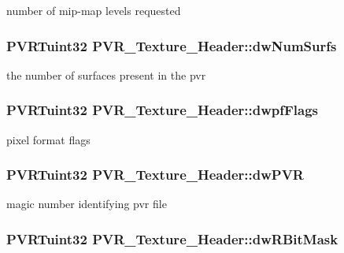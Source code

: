 number of mip-\/map levels requested \hypertarget{struct_p_v_r___texture___header_a9935bb426fcdb2b1ec3fab9fab003a98}{
\subsubsection[{dw\+Num\+Surfs}]{\setlength{\rightskip}{0pt plus 5cm}P\+V\+R\+Tuint32 P\+V\+R\+\_\+\+Texture\+\_\+\+Header\+::dw\+Num\+Surfs}}\label{struct_p_v_r___texture___header_a9935bb426fcdb2b1ec3fab9fab003a98}
the number of surfaces present in the pvr \hypertarget{struct_p_v_r___texture___header_a5e5b584c49798aeffea0ee25a1c55019}{
\subsubsection[{dwpf\+Flags}]{\setlength{\rightskip}{0pt plus 5cm}P\+V\+R\+Tuint32 P\+V\+R\+\_\+\+Texture\+\_\+\+Header\+::dwpf\+Flags}}\label{struct_p_v_r___texture___header_a5e5b584c49798aeffea0ee25a1c55019}
pixel format flags \hypertarget{struct_p_v_r___texture___header_a97a44950be630b5f67ad62cd94648f5f}{
\subsubsection[{dw\+P\+V\+R}]{\setlength{\rightskip}{0pt plus 5cm}P\+V\+R\+Tuint32 P\+V\+R\+\_\+\+Texture\+\_\+\+Header\+::dw\+P\+V\+R}}\label{struct_p_v_r___texture___header_a97a44950be630b5f67ad62cd94648f5f}
magic number identifying pvr file \hypertarget{struct_p_v_r___texture___header_ae0c5f4ecec509d383e8279174f060223}{
\subsubsection[{dw\+R\+Bit\+Mask}]{\setlength{\rightskip}{0pt plus 5cm}P\+V\+R\+Tuint32 P\+V\+R\+\_\+\+Texture\+\_\+\+Header\+::dw\+R\+Bit\+Mask}}\label{struct_p_v_r___texture___header_ae0c5f4ecec509d383e8279174f060223}
